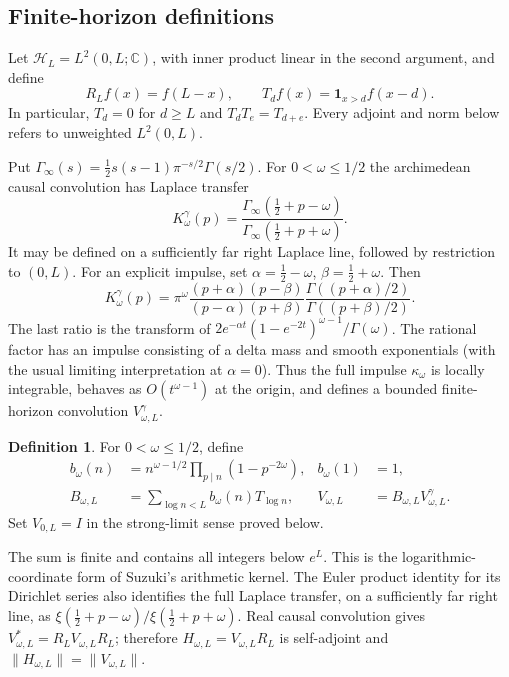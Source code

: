 \documentclass[11pt]{article}
\numberwithin{equation}{section}
\theoremstyle{definition}
\newtheorem{definition}[theorem]{Definition}
\theoremstyle{remark}
\newcommand{\HH}{\mathcal H}
\newcommand{\CC}{\mathbb C}
\newcommand{\norm}[1]{\lVert#1\rVert}
\newcommand{\gam}{\Gamma_\infty}
\begin{document}
\subsection{Finite-horizon definitions}

Let $\HH_L=L^2(0,L;\CC)$, with inner product linear in the second argument,
and define
\[
 R_Lf(x)=f(L-x),\qquad T_df(x)=\mathbf1_{x>d}f(x-d).
\]
In particular, $T_d=0$ for $d\ge L$ and
$T_dT_e=T_{d+e}$. Every adjoint and norm below refers to unweighted
$L^2(0,L)$.

Put $\gam(s)=\tfrac12s(s-1)\pi^{-s/2}\Gamma(s/2)$. For $0<\omega\le1/2$
the archimedean causal convolution has Laplace transfer
\begin{equation}\label{eq:gammaK}
 K^\gamma_\omega(p)=
 \frac{\gam(\tfrac12+p-\omega)}{\gam(\tfrac12+p+\omega)}.
\end{equation}
It may be defined on a sufficiently far right Laplace line, followed by
restriction to $(0,L)$. For an explicit impulse, set
$\alpha=\tfrac12-\omega$, $\beta=\tfrac12+\omega$. Then
\begin{equation}\label{eq:gammafactor}
 K^\gamma_\omega(p)=\pi^\omega
 \frac{(p+\alpha)(p-\beta)}{(p-\alpha)(p+\beta)}
 \frac{\Gamma((p+\alpha)/2)}{\Gamma((p+\beta)/2)}.
\end{equation}
The last ratio is the transform of
$2e^{-\alpha t}(1-e^{-2t})^{\omega-1}/\Gamma(\omega)$.
The rational factor has an impulse consisting of a delta mass and smooth
exponentials (with the usual limiting interpretation at $\alpha=0$).
Thus the full impulse $\kappa_\omega$ is locally integrable, behaves as
$O(t^{\omega-1})$ at the origin, and defines a bounded finite-horizon
convolution $V^\gamma_{\omega,L}$.

\begin{definition}\label{def:transfer}
For $0<\omega\le1/2$, define
\begin{align}
 b_\omega(n)&=n^{\omega-1/2}\prod_{p\mid n}(1-p^{-2\omega}),
 & b_\omega(1)&=1,\label{eq:bcoeff}\\
 B_{\omega,L}&=\sum_{\log n<L}b_\omega(n)T_{\log n},
 &V_{\omega,L}&=B_{\omega,L}V^\gamma_{\omega,L}.\label{eq:Vdef}
\end{align}
Set $V_{0,L}=I$ in the strong-limit sense proved below.
\end{definition}

The sum is finite and contains all integers below $e^L$. This is the
logarithmic-coordinate form of Suzuki's arithmetic kernel. The Euler product
identity for its Dirichlet series also identifies the full Laplace transfer,
on a sufficiently far right line, as
$\xi(\tfrac12+p-\omega)/\xi(\tfrac12+p+\omega)$.
Real causal convolution gives $V_{\omega,L}^*=R_LV_{\omega,L}R_L$;
therefore $H_{\omega,L}=V_{\omega,L}R_L$ is self-adjoint and
$\norm{H_{\omega,L}}=\norm{V_{\omega,L}}$.
\end{document}
